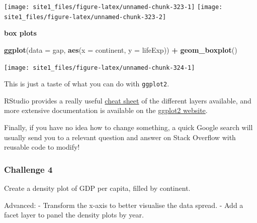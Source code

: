 \documentclass[]{book}
\newenvironment{Shaded}{\begin{snugshade}}{\end{snugshade}}
\newcommand{\KeywordTok}[1]{\textcolor[rgb]{0.13,0.29,0.53}{\textbf{#1}}}
\newcommand{\DataTypeTok}[1]{\textcolor[rgb]{0.13,0.29,0.53}{#1}}
\newcommand{\StringTok}[1]{\textcolor[rgb]{0.31,0.60,0.02}{#1}}
\newcommand{\OperatorTok}[1]{\textcolor[rgb]{0.81,0.36,0.00}{\textbf{#1}}}
\newcommand{\NormalTok}[1]{#1}
\begin{document}
\begin{center}\texttt{[image: site1\_files/figure-latex/unnamed-chunk-323-1]} \texttt{[image: site1\_files/figure-latex/unnamed-chunk-323-2]} \end{center}

\textbf{box plots}

\begin{Shaded}
\begin{Highlighting}[]
\KeywordTok{ggplot}\NormalTok{(}\DataTypeTok{data =}\NormalTok{ gap, }\KeywordTok{aes}\NormalTok{(}\DataTypeTok{x =}\NormalTok{ continent, }\DataTypeTok{y =}\NormalTok{ lifeExp)) }\OperatorTok{+}\StringTok{ }
\StringTok{  }\KeywordTok{geom_boxplot}\NormalTok{()}
\end{Highlighting}
\end{Shaded}

\begin{center}\texttt{[image: site1\_files/figure-latex/unnamed-chunk-324-1]} \end{center}

This is just a taste of what you can do with \texttt{ggplot2}.

RStudio provides a really useful
\href{https://www.rstudio.com/wp-content/uploads/2015/03/ggplot2-cheatsheet.pdf}{cheat
sheet} of the different layers available, and more extensive
documentation is available on the
\href{http://docs.ggplot2.org/current/}{ggplot2 website}.

Finally, if you have no idea how to change something, a quick Google
search will usually send you to a relevant question and answer on Stack
Overflow with reusable code to modify!

\subsubsection*{Challenge 4}\label{challenge-4}

Create a density plot of GDP per capita, filled by continent.

Advanced: - Transform the x-axis to better visualise the data spread. -
Add a facet layer to panel the density plots by year.
\end{document}
